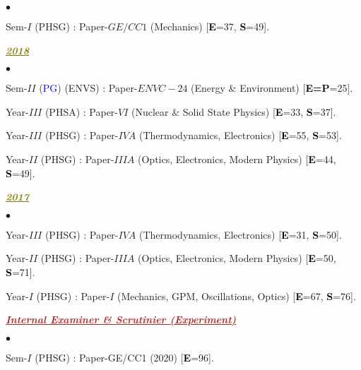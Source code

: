 \documentclass[margin,line]{res}
\newenvironment{list1}{
  \begin{list}{\ding{113}}{%
      \setlength{\itemsep}{0in}
      \setlength{\parsep}{0in} \setlength{\parskip}{0in}
      \setlength{\topsep}{0in} \setlength{\partopsep}{0in} 
      \setlength{\leftmargin}{0.17in}}}{\end{list}}
\newenvironment{list2}{
  \begin{list}{$\bullet$}{%
      \setlength{\itemsep}{0in}
      \setlength{\parsep}{0in} \setlength{\parskip}{0in}
      \setlength{\topsep}{0in} \setlength{\partopsep}{0in} 
      \setlength{\leftmargin}{0.2in}}}{\end{list}}
\begin{document}
\begin{resume}
\begin{list2}
\item Sem-$I$ (PHSG) : Paper-$GE/CC1$ (Mechanics) [\textcolor{black}{\bf E}=37, \textcolor{black}{\bf S}=49]. 
\end{list2}
\begin{list1}
\item[] \textcolor{olive}{\underline{\textbf{\textit{2018}}}}
\vspace{1mm}
\end{list1}
\begin{list2}
\item Sem-$II$ (\textcolor{blue}{PG}) (ENVS) : Paper-$ENVC-24$ (Energy \& Environment) [\textcolor{black}{\bf E=P}=25].
\item Year-$III$ (PHSA) : Paper-$VI$ (Nuclear \& Solid State Physics) [\textcolor{black}{\bf E}=33, \textcolor{black}{\bf S}=37]. 
\item Year-$III$ (PHSG) : Paper-$IVA$ (Thermodynamics, Electronics) [\textcolor{black}{\bf E}=55, \textcolor{black}{\bf S}=53].
\item Year-$II$ (PHSG) : Paper-$IIIA$ (Optics, Electronics, Modern Physics) [\textcolor{black}{\bf E}=44, \textcolor{black}{\bf S}=49].
\end{list2}
\begin{list1}
\item[] \textcolor{olive}{\underline{\textbf{\textit{2017}}}}
\vspace{1mm}
\end{list1}
\begin{list2}
\item Year-$III$ (PHSG) : Paper-$IVA$ (Thermodynamics, Electronics) [\textcolor{black}{\bf E}=31, \textcolor{black}{\bf S}=50].
\item Year-$II$ (PHSG) : Paper-$IIIA$ (Optics, Electronics, Modern Physics) [\textcolor{black}{\bf E}=50, \textcolor{black}{\bf S}=71].
\item Year-$I$ (PHSG) : Paper-$I$ (Mechanics, GPM, Oscillations, Optics) [\textcolor{black}{\bf E}=67, \textcolor{black}{\bf S}=76].
\end{list2}
\vspace{2mm}
\begin{list1}
\item[] \textcolor{brown}{\underline{\textbf{\textit{Internal Examiner \& Scrutinier (Experiment)}}}}
\vspace{1mm}
\end{list1}
\begin{list2}
\item Sem-$I$ (PHSG) : Paper-GE/CC1 (2020) [\textcolor{black}{\bf E}=96]. 

\end{list2}
\end{resume}
\end{document}
